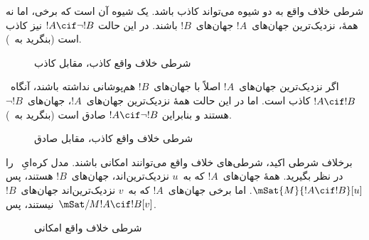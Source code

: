 \documentclass[../../../include/open-logic-section]{subfiles}
\begin{document}
شرطی خلاف واقع به دو شیوه می‌تواند کاذب باشد. یک شیوه آن است که برخی،
اما نه همهٔ، نزدیک‌ترین جهان‌های~$!A$ جهان‌های~$!B$ باشند. در این حالت
$!A \cif \lnot !B$ نیز کاذب است (بنگرید به~).
\begin{figure}
\begin{center}
\caption{شرطی خلاف واقع کاذب، مقابل کاذب}
\end{center}
\end{figure}
اگر نزدیک‌ترین جهان‌های~$!A$ اصلاً با جهان‌های~$!B$ هم‌پوشانی نداشته
باشند، آنگاه~$!A \cif !B$ کاذب است. اما در این حالت همهٔ نزدیک‌ترین
جهان‌های~$!A$، جهان‌های~$\lnot !B$ هستند و بنابراین
$!A \cif \lnot !B$ صادق است (بنگرید به~).
\begin{figure}
\begin{center}
\caption{شرطی خلاف واقع کاذب، مقابل صادق}
\end{center}
\end{figure}

برخلاف شرطی اکید، شرطی‌های خلاف واقع می‌توانند امکانی باشند. مدل
کره‌ایِ~ را در نظر بگیرید. همهٔ جهان‌های~$!A$ که
به~$u$ نزدیک‌ترین‌اند، جهان‌های~$!B$ هستند، پس
$\mSat{M}{!A \cif !B}[u]$. اما برخی جهان‌های~$!A$ که به~$v$
نزدیک‌ترین‌اند جهان‌های~$!B$ نیستند، پس~$\mSat/{M}{!A \cif !B}[v]$.
\begin{figure}
\begin{center}
\end{center}
\caption{شرطی خلاف واقع امکانی}
\end{figure}
\end{document}
